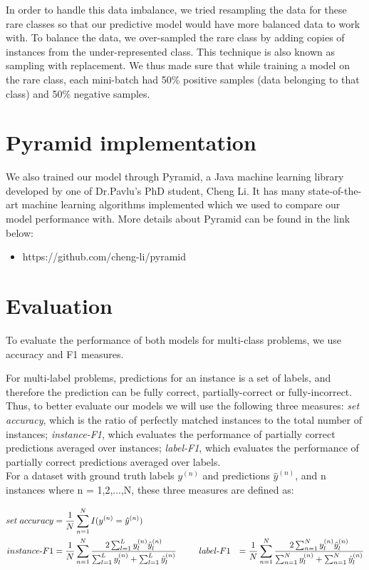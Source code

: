In order to handle this data imbalance, we tried resampling the data for these rare classes so that our predictive model would have more balanced data to work with. To balance the data, we over-sampled the rare class by adding copies of instances from the under-represented class. This technique is also known as sampling with replacement. We thus made sure that while training a model on the rare class, each mini-batch had 50\% positive samples (data belonging to that class) and 50\% negative samples.

\section{Pyramid implementation}

We also trained our model through Pyramid, a Java machine learning library developed by one of Dr.Pavlu's PhD student, Cheng Li. It has many state-of-the-art machine learning algorithms implemented which we used to compare our model performance with. More details about Pyramid can be found in the link below:

\begin{itemize}
\item https://github.com/cheng-li/pyramid
\end{itemize}

\section{Evaluation}

To evaluate the performance of both models for multi-class problems, we use accuracy and F1 measures.

For multi-label problems, predictions for an instance is a set of labels, and therefore the prediction can be fully correct, partially-correct or fully-incorrect. Thus, to better evaluate our models we will use the following three measures: \textit{set accuracy}, which is the ratio of perfectly matched instances to the total number of instances; \textit{instance-F1}, which evaluates the performance of partially correct predictions averaged over instances; \textit{label-F1}, which evaluates the performance of partially correct predictions averaged over labels.\\

For a dataset with ground truth labels $y^{(n)}$ and predictions $\hat{y}^{(n)}$, and n instances where n = 1,2,...,N, these three measures are defined as:

\begin{alignat}{2}
\label{eq:eval}
set\; accuracy & = \frac{1}{N} \sum_{n=1}^{N} {I(y^{(n)} = \hat{y}^{(n)})}\\
instance \mbox{-} F1 & = \frac{1}{N} \sum_{n=1}^{N} \frac{2\sum_{l=1}^{L} {y^{(n)}_{l} \hat{y}^{(n)}_{l}}}{\sum_{l=1}^{L} {y^{(n)}_{l}} + \sum_{l=1}^{L} {\hat{y}^{(n)}_{l}}}
\hspace{6ex}
label \mbox{-} F1 & = \frac{1}{N} \sum_{n=1}^{N} \frac{2\sum_{n=1}^{N} {y^{(n)}_{l} \hat{y}^{(n)}_{l}}}{\sum_{n=1}^{N} {y^{(n)}_{l}} + \sum_{n=1}^{N} {\hat{y}^{(n)}_{l}}}
\end{alignat}

